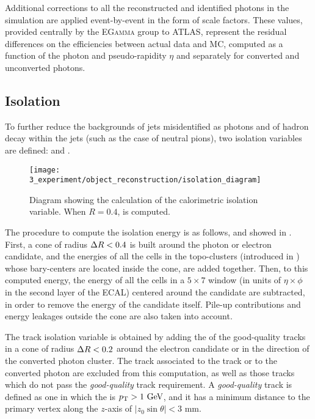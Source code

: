 Additional corrections to all the reconstructed and identified photons in the simulation are applied event-by-event in the form of scale factors. These values, provided centrally by the \textsc{EGamma} group to \ac{ATLAS}, represent the residual differences on the efficiencies between actual data and \ac{MC}, computed as a function of the photon \pt and pseudo-rapidity \(\eta\) and separately for converted and unconverted photons.








\subsection{Isolation}
\label{subsec:objects:egamma:iso}

To further reduce the backgrounds of jets misidentified as photons and of hadron decay within the jets (such as the case of neutral pions), two isolation variables are defined: \etconefo and \ptconetw.

\begin{figure}[ht!]
    \centering
    \texttt{[image: 3\_experiment/object\_reconstruction/isolation\_diagram]}
    \caption{Diagram showing the calculation of the calorimetric isolation variable. When \(R=0.4\), \etconefo is computed.}
    \label{fig:objects:egamma:iso:iso_diagram}
\end{figure}

The procedure to compute the isolation energy \etconefo is as follows, and showed in \Fig{\ref{fig:objects:egamma:iso:iso_diagram}}. First, a cone of radius \(\Delta R<0.4\) is built around the photon or electron candidate, and the energies of all the cells in the topo-clusters (introduced in \Sect{\ref{subsec:objects:egamma:reco}}) whose bary-centers are located inside the cone, are added together. Then, to this computed energy, the energy of all the cells in a \(5\times 7\) window (in units of \(\eta \times \phi\) in the second layer of the \ac{ECAL}) centered around the candidate are subtracted, in order to remove the energy of the candidate itself. Pile-up contributions and energy leakages outside the cone are also taken into account.

The track isolation variable \ptconetw is obtained by adding the \pt of the good-quality tracks in a cone of radius \(\Delta R<0.2\) around the electron candidate or in the direction of the converted photon cluster.
The track associated to the track or to the converted photon are excluded from this computation, as well as those tracks which do not pass the \textit{good-quality} track requirement. A \textit{good-quality} track is defined as one in which the \pt is \(p_{\text{T}}>1~\text{GeV}\), and it has a minimum distance to the primary vertex along the \(z\)-axis of \(|z_0 \sin \theta| < 3\) mm.

